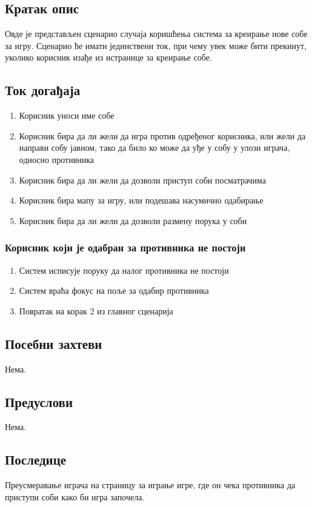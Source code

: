 \subsection{Кратак опис}
Овде је представљен сценарио случаја коришћења система за креирање нове собе за игру.
Сценарио ће имати јединствени ток, при чему увек може бити прекинут, уколико корисник
изађе из истранице за креирање собе.

\subsection{Ток догађаја}
\begin{enumerate}
	\item Корисник уноси име собе
	\item Корисник бира да ли жели да игра против одређеног корисника, или жели да
	направи собу јавном, тако да било ко може да уђе у собу у улози играча, односно
	противника
	\item Корисник бира да ли жели да дозволи приступ соби посматрачима
	\item Корисник бира мапу за игру, или подешава насумично одабирање
	\item Корисник бира да ли жели да дозволи размену порука у соби
\end{enumerate}

\subsubsection{Корисник који је одабран за противника не постоји}
\begin{enumerate}[label=2.\arabic*]
	\item Систем исписује поруку да налог противника не постоји
	\item Систем враћа фокус на поље за одабир противника
	\item Повратак на корак 2 из главног сценарија
\end{enumerate}

\subsection{Посебни захтеви}
Нема.

\subsection{Предуслови}
Нема.

\subsection{Последице}
Преусмеравање играча на страницу за играње игре, где он чека противника да приступи соби како би игра започела.

